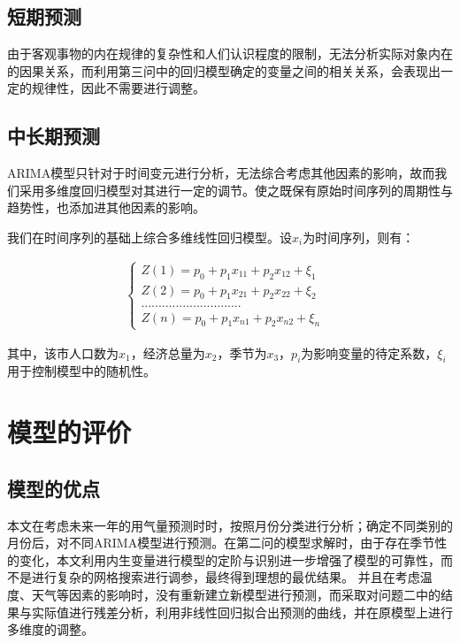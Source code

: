 \documentclass{whutmod}
\begin{document}
	\subsection{短期预测}
	由于客观事物的内在规律的复杂性和人们认识程度的限制，无法分析实际对象内在的因果关系，而利用第三问中的回归模型确定的变量之间的相关关系，会表现出一定的规律性，因此不需要进行调整。
	\subsection{中长期预测}
	ARIMA模型只针对于时间变元进行分析，无法综合考虑其他因素的影响，故而我们采用多维度回归模型对其进行一定的调节。使之既保有原始时间序列的周期性与趋势性，也添加进其他因素的影响。
	
	我们在时间序列的基础上综合多维线性回归模型。设$x_{i}$为时间序列，则有：
	\begin{center}
		
		\begin{gather}
			\left\{  
			\begin{aligned}  
				Z(1)=p_{0}+p_{1}x_{11}+p_{2}x_{12}+\xi _{1} &  \\  
				Z(2)=p_{0}+p_{1}x_{21}+p_{2}x_{22}+\xi _{2} & \\
				............................. & \\  
				Z(n)=p_{0}+p_{1}x_{n1}+p_{2}x_{n2}+\xi _{n}&    
			\end{aligned}  
			\right.  
		\end{gather}
	\end{center}
	
	其中，该市人口数为$x_{1}$，经济总量为$x_{2}$，季节为$x_{3}$，$p_{i}$为影响变量的待定系数，$\xi _{i}$用于控制模型中的随机性。
	\section{模型的评价}
	\subsection{模型的优点}
	本文在考虑未来一年的用气量预测时时，按照月份分类进行分析；确定不同类别的月份后，对不同ARIMA模型进行预测。在第二问的模型求解时，由于存在季节性的变化，本文利用内生变量进行模型的定阶与识别进一步增强了模型的可靠性，而不是进行复杂的网格搜索进行调参，最终得到理想的最优结果。 并且在考虑温度、天气等因素的影响时，没有重新建立新模型进行预测，而采取对问题二中的结果与实际值进行残差分析，利用非线性回归拟合出预测的曲线，并在原模型上进行多维度的调整。
	
\end{document}
